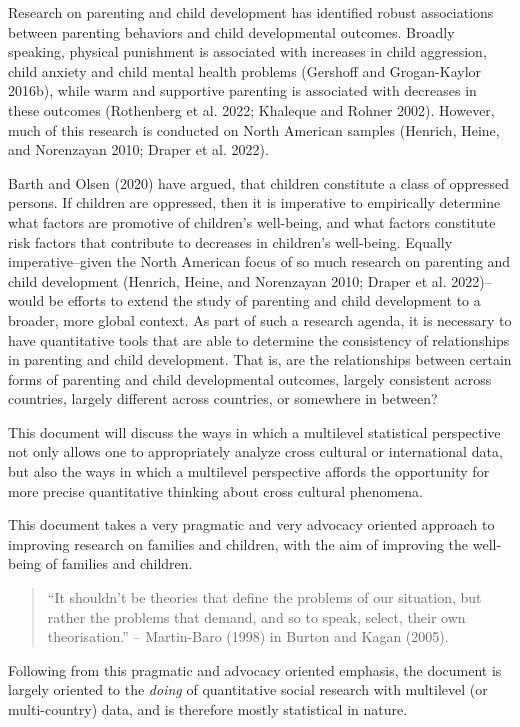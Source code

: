 \documentclass[
  letterpaper,
  DIV=11,
  numbers=noendperiod]{scrreprt}
\begin{document}
Research on parenting and child development has identified robust
associations between parenting behaviors and child developmental
outcomes. Broadly speaking, physical punishment is associated with
increases in child aggression, child anxiety and child mental health
problems (Gershoff and Grogan-Kaylor 2016b), while warm and supportive
parenting is associated with decreases in these outcomes (Rothenberg et
al. 2022; Khaleque and Rohner 2002). However, much of this research is
conducted on North American samples (Henrich, Heine, and Norenzayan
2010; Draper et al. 2022).

Barth and Olsen (2020) have argued, that children constitute a class of
oppressed persons. If children are oppressed, then it is imperative to
empirically determine what factors are promotive of children's
well-being, and what factors constitute risk factors that contribute to
decreases in children's well-being. Equally imperative--given the North
American focus of so much research on parenting and child development
(Henrich, Heine, and Norenzayan 2010; Draper et al. 2022)--would be
efforts to extend the study of parenting and child development to a
broader, more global context. As part of such a research agenda, it is
necessary to have quantitative tools that are able to determine the
consistency of relationships in parenting and child development. That
is, are the relationships between certain forms of parenting and child
developmental outcomes, largely consistent across countries, largely
different across countries, or somewhere in between?

This document will discuss the ways in which a multilevel statistical
perspective not only allows one to appropriately analyze cross cultural
or international data, but also the ways in which a multilevel
perspective affords the opportunity for more precise quantitative
thinking about cross cultural phenomena.

This document takes a very pragmatic and very advocacy oriented approach
to improving research on families and children, with the aim of
improving the well-being of families and children.

\begin{quote}
``It shouldn't be theories that define the problems of our situation,
but rather the problems that demand, and so to speak, select, their own
theorisation.'' -- Martin-Baro (1998) in Burton and Kagan (2005).
\end{quote}

Following from this pragmatic and advocacy oriented emphasis, the
document is largely oriented to the \emph{doing} of quantitative social
research with multilevel (or multi-country) data, and is therefore
mostly statistical in nature.
\end{document}
